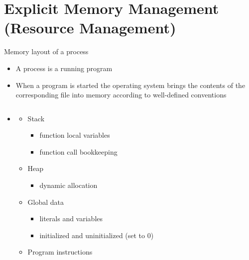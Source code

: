 

\section {Explicit Memory Management\\(Resource Management)}

\begin{frame}{Memory layout of a process}

  \begin{itemize}
  \item A process is a running program
  \item When a program is started the operating system brings the contents of
    the corresponding file into memory according to well-defined conventions
  \end{itemize}

  \begin{columns}
    \begin{column}{.7\textwidth}
      \begin{itemize}
        \item[]
      \begin{itemize}
      \item Stack
        \begin{itemize}
        \item function local variables
        \item function call bookkeeping
        \end{itemize}
      \item Heap
        \begin{itemize}
        \item dynamic allocation
        \end{itemize}
      \item Global data
        \begin{itemize}
        \item literals and variables
        \item initialized and uninitialized (set to 0)
        \end{itemize}
      \item Program instructions
      \end{itemize}
    \end{itemize}
  \end{column}


\end{columns}
\end{frame}
